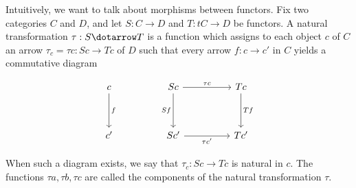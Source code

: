 Intuitively, we want to talk about morphisms between functors. Fix two categories $C$ and $D$, and let $S: C \to D$ and $T: tC \to D$ be functors. 
A natural transformation $\tau: S \dotarrow T$ is a function which assigns to each object $c$ of $C$ an arrow $\tau_c = \tau c : Sc \to Tc$ of $D$ such that 
every arrow $f: c \to c'$ in $C$ yields a commutative diagram 

\[\begin{tikzcd}
	c && Sc && Tc \\
	\\
	{c'} && {Sc'} && {Tc'}
	\arrow["f", from=1-1, to=3-1]
	\arrow["Sf"', from=1-3, to=3-3]
	\arrow["{\tau c}", from=1-3, to=1-5]
	\arrow["Tf", from=1-5, to=3-5]
	\arrow["{\tau c'}"', from=3-3, to=3-5]
\end{tikzcd}\]

When such a diagram exists, we say that $\tau_c : Sc \to Tc$ is natural in $c$. The functions $\tau a, \tau b, \tau c$ are called the components of the natural transformation $\tau$.
